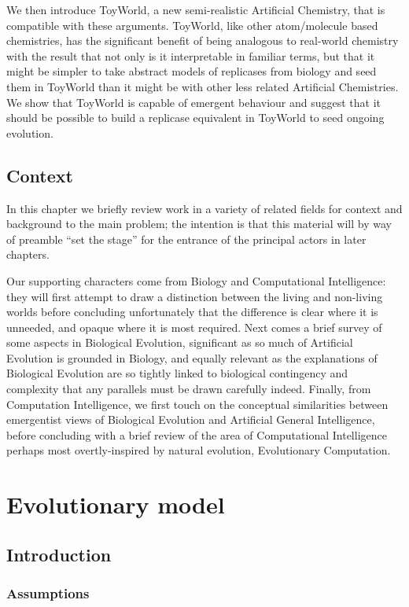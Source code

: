 \documentclass[]{report}
\begin{document}
We then introduce ToyWorld, a new semi-realistic Artificial Chemistry, that is compatible with these arguments. ToyWorld, like other atom/molecule based chemistries, has the significant benefit of being analogous to real-world chemistry with the result that not only is it interpretable in familiar terms, but that it might be simpler to take abstract models of replicases from biology and seed them in ToyWorld than it might be with other less related Artificial Chemistries. We show that ToyWorld is capable of emergent behaviour and suggest that it should be possible to build a replicase equivalent in ToyWorld to seed ongoing evolution.

\chapter{Context}
In this chapter we briefly review work in a variety of related fields for context and background to the main problem; the intention is that this material will by way of preamble ``set the stage'' for the entrance of the principal actors in later chapters.

Our supporting characters come from Biology and Computational Intelligence: they will first attempt to draw a distinction between the living and non-living worlds before concluding unfortunately that the difference is clear where it is unneeded, and opaque where it is most required. Next comes a brief survey of some aspects in Biological Evolution, significant as so much of Artificial Evolution is grounded in Biology, and equally relevant as the explanations of Biological Evolution are so tightly linked to biological contingency and complexity that any parallels must be drawn carefully indeed. Finally, from Computation Intelligence, we first touch on the conceptual similarities between emergentist views of Biological Evolution and Artificial General Intelligence, before concluding with a brief review of the area of Computational Intelligence perhaps most overtly-inspired by natural evolution, Evolutionary Computation.

\part{Evolutionary model}
\chapter{Introduction}\label{part-one}
\section{Assumptions}
\end{document}
